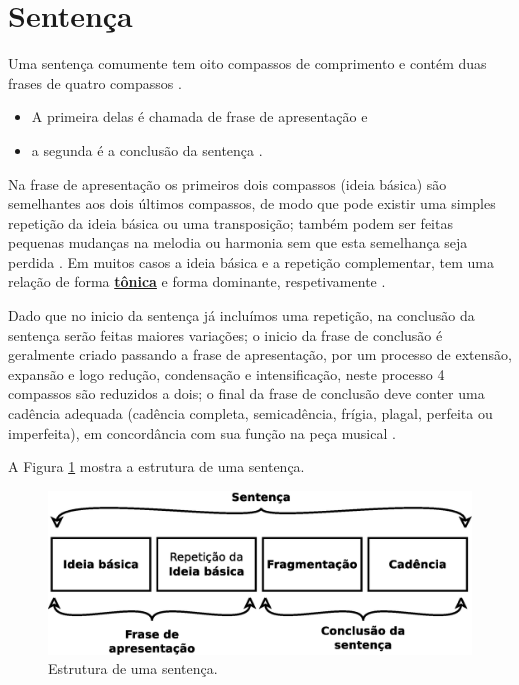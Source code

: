 \newpage
\section{Sentença}
\label{sec:sentence}
Uma sentença comumente tem oito compassos de comprimento e 
contém duas frases de quatro compassos \cite[pp. 48]{schoenberg1990fundamentos} \cite[pp. 21]{schoenberg1967fundamentals}.

\begin{itemize}
\item A primeira delas é chamada de frase de apresentação  e 
\item a segunda é a conclusão da sentença  \cite[pp. 58]{schoenberg1990fundamentos} \cite[pp. 58]{schoenberg1967fundamentals}.

\end{itemize}

Na frase de apresentação os primeiros dois compassos (ideia básica) são semelhantes aos dois últimos compassos,
de modo que pode existir uma simples repetição da ideia básica ou uma transposição;
também podem ser feitas pequenas mudanças na melodia ou harmonia sem que esta semelhança seja perdida \cite[pp. 48]{schoenberg1990fundamentos} \cite[pp. 21]{schoenberg1967fundamentals}.
Em muitos casos a ideia básica e a repetição complementar, tem uma relação de
forma \hyperref[sec:Tonica]{\textbf{tônica}} e forma dominante, 
respetivamente \cite[pp. 49]{schoenberg1990fundamentos} \cite[pp. 21]{schoenberg1967fundamentals}.

Dado que no inicio da sentença já incluímos uma repetição,
na conclusão da sentença serão feitas maiores variações;
o inicio da frase de conclusão é geralmente criado passando a frase de apresentação,
por um processo de extensão, expansão e logo redução, condensação e intensificação, 
neste processo 4 compassos são reduzidos a dois;
o final da frase de conclusão deve conter uma cadência adequada 
(cadência completa, semicadência, frígia, plagal, perfeita ou imperfeita),
em concordância com sua função na peça musical
\cite[pp. 59-59]{schoenberg1990fundamentos} \cite[pp. 58-59]{schoenberg1967fundamentals}.

A Figura \ref{fig:sentencestruct} mostra a estrutura de uma sentença. 
\begin{figure}[!h]
  \centering
    \includegraphics[width=\textwidth]{chapters/cap-musica-composer/sentencia.eps}
\caption{Estrutura de uma sentença.}
\label{fig:sentencestruct}
\end{figure}





